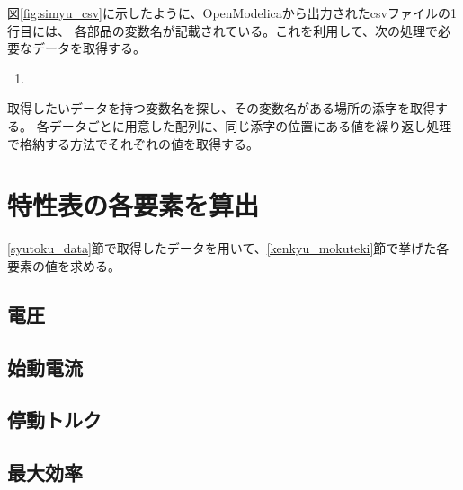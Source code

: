 図\ref{fig:simyu_csv}に示したように、OpenModelicaから出力されたcsvファイルの1行目には、
各部品の変数名が記載されている。これを利用して、次の処理で必要なデータを取得する。

\begin{enumerate}
    \item 
\end{enumerate}
取得したいデータを持つ変数名を探し、その変数名がある場所の添字を取得する。
各データごとに用意した配列に、同じ添字の位置にある値を繰り返し処理で格納する方法でそれぞれの値を取得する。

\section{特性表の各要素を算出}\label{keisan}
\ref{syutoku_data}節で取得したデータを用いて、\ref{kenkyu_mokuteki}節で挙げた各要素の値を求める。

\subsection{電圧}\label{sub:keisan_dennatu}

\subsection{始動電流}\label{sub:keisan_sidouden}


\subsection{停動トルク}\label{sub:keisan_teidoutoruku}


\subsection{最大効率}\label{sub:keisan_saidaikouritu}

